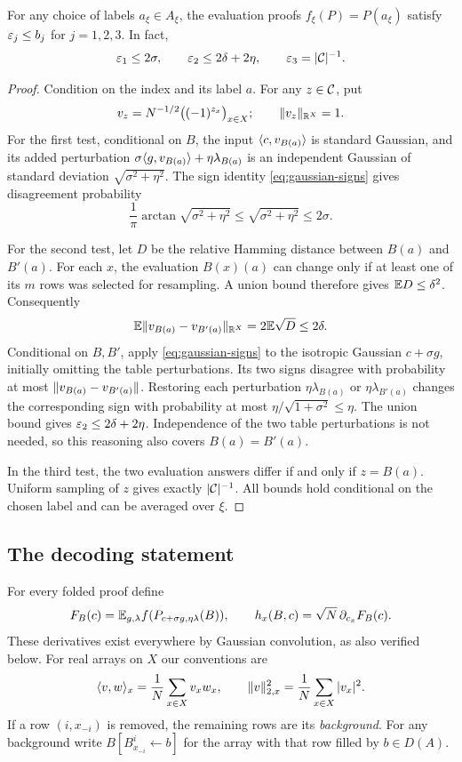 \begin{lemma}\label{lem:honest}
For any choice of labels $a_\xi\in A_\xi$, the evaluation proofs
$f_\xi(P)=P(a_\xi)$ satisfy $\varepsilon_j\le b_j$ for $j=1,2,3$.
In fact,
\[
 \varepsilon_1\le 2\sigma,\qquad
 \varepsilon_2\le2\delta+2\eta,\qquad
 \varepsilon_3=|\mathcal C|^{-1}.
\]
\end{lemma}
\begin{proof}
Condition on the index and its label $a$. For any $z\in\mathcal C$, put
\[
 v_z=N^{-1/2}\bigl((-1)^{z_x}\bigr)_{x\in X};
 \qquad \lVert v_z\rVert_{\mathbb R^X}=1.
\]
For the first test, conditional on $B$, the input
$\langle c,v_{B(a)}\rangle$ is standard Gaussian, and its added perturbation
$\sigma\langle g,v_{B(a)}\rangle+\eta\lambda_{B(a)}$ is an independent Gaussian
of standard deviation $\sqrt{\sigma^2+\eta^2}$. The sign identity
\eqref{eq:gaussian-signs} gives disagreement probability
\[
 \frac1\pi\arctan\sqrt{\sigma^2+\eta^2}
 \le\sqrt{\sigma^2+\eta^2}\le2\sigma.
\]

For the second test, let $D$ be the relative Hamming distance between
$B(a)$ and $B'(a)$. For each $x$, the evaluation $B(x)(a)$ can change only
if at least one of its $m$ rows was selected for resampling. A union bound
therefore gives $\mathbb E D\le\delta^2$. Consequently
\[
 \mathbb E\lVert v_{B(a)}-v_{B'(a)}\rVert_{\mathbb R^X}
 =2\mathbb E\sqrt D\le2\delta.
\]
Conditional on $B,B'$, apply \eqref{eq:gaussian-signs} to the isotropic
Gaussian $c+\sigma g$, initially omitting the table perturbations. Its
two signs disagree with probability at most
$\lVert v_{B(a)}-v_{B'(a)}\rVert$. Restoring each perturbation
$\eta\lambda_{B(a)}$ or $\eta\lambda_{B'(a)}$ changes the corresponding
sign with probability at most
$\eta/\sqrt{1+\sigma^2}\le\eta$. The union bound gives
$\varepsilon_2\le2\delta+2\eta$. Independence of the two table perturbations
is not needed, so this reasoning also covers $B(a)=B'(a)$.

In the third test, the two evaluation answers differ if and only if
$z=B(a)$. Uniform sampling of $z$ gives exactly $|\mathcal C|^{-1}$. All bounds
hold conditional on the chosen label and can be averaged over $\xi$.
\end{proof}

\subsection{The decoding statement}

For every folded proof define
\begin{equation}\label{eq:smoothed-gradient}
 F_B(c)=\mathbb E_{g,\lambda} f(P_{c+\sigma g,\eta\lambda}(B)),
 \qquad h_x(B,c)=\sqrt N\,\partial_{c_x}F_B(c).
\end{equation}
These derivatives exist everywhere by Gaussian convolution, as also
verified below. For real arrays on $X$ our conventions are
\[
 \langle v,w\rangle_x=\frac1N\sum_{x\in X}v_xw_x,
 \qquad \lVert v\rVert_{2,x}^2=\frac1N\sum_{x\in X}|v_x|^2.
\]
If a row $(i,x_{-i})$ is removed, the remaining rows are its
\emph{background}. For any background write
$B[B^i_{x_{-i}}\leftarrow b]$ for the array with that row filled by
$b\in D(A)$.

